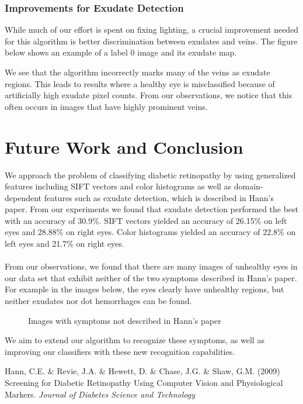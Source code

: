 \documentclass{article} %
\begin{document}
\subsubsection{Improvements for Exudate Detection}
While much of our effort is spent on fixing lighting, a crucial improvement needed for this algorithm is better discrimination between exudates and veins. The figure below shows an example of a label 0 image and its exudate map.

\begin{figure}[htp]
  \centering
  \quad
\end{figure}

 We see that the algorithm incorrectly marks many of the veins as exudate regions. This leads to results where a healthy eye is misclassified because of artificially high exudate pixel counts. From our observations, we notice that this often occurs in images that have highly prominent veins.

\section{Future Work and Conclusion}
We approach the problem of classifying diabetic retinopathy by using generalized features including SIFT vectors and color histograms as well as domain-dependent features such as exudate detection, which is described in Hann's paper. From our experiments we found that exudate detection performed the best with an accuracy of 30.9\%. SIFT vectors yielded an accuracy of 26.15\% on left eyes and 28.88\% on right eyes. Color histograms yielded an accuracy of 22.8\% on left eyes and 21.7\% on right eyes. \\ \\
From our observations, we found that there are many images of unhealthy eyes in our data set that exhibit neither of the two symptoms described in Hann's paper. For example in the images below, the eyes clearly have unhealthy regions, but neither exudates nor dot hemorrhages can be found. 

\begin{figure}[htp]
  \centering
  \quad
\caption{Images with symptoms not described in Hann's paper}
\end{figure}

We aim to extend our algorithm to recognize these symptoms, as well as improving our classifiers with these new recognition capabilities.

\begin{thebibliography}{9}
Hann, C.E. \& Revie, J.A. \& Hewett, D. \& Chase, J.G. \& Shaw, G.M.
(2009) Screening for Diabetic Retinopathy Using Computer Vision and Physiological Markers. 
{\it Journal of Diabetes Science and Technology}
\end{thebibliography}
\end{document}
